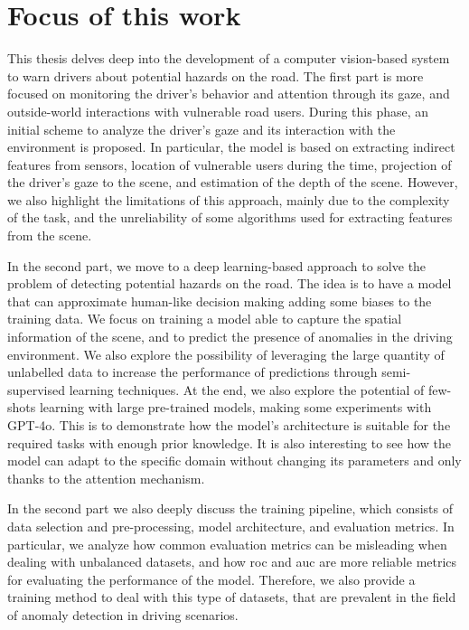 \section{Focus of this work}
\label{sec:focus}
This thesis delves deep into the development of a computer vision-based system 
to warn drivers about potential hazards on the road. The first part is more 
focused on monitoring the driver's behavior and attention through its gaze, and 
outside-world interactions with vulnerable road users. During this phase, 
an initial scheme to analyze the driver's gaze and its interaction with the 
environment is proposed. In particular, the model is based on extracting indirect 
features from sensors, location of vulnerable users during the time, projection 
of the driver's gaze to the scene, and estimation of the depth of the scene.
However, we also highlight the limitations of this approach, mainly due to the 
complexity of the task, and the unreliability of some algorithms used for 
extracting features from the scene.

In the second part, we move to a deep learning-based approach to solve the 
problem of detecting potential hazards on the road. The idea is to have a model 
that can approximate human-like decision making adding some biases to the 
training data.
We focus on training a model 
able to capture the spatial information of the scene, and to predict the presence 
of anomalies in the driving environment. We also explore the possibility of 
leveraging the large quantity of unlabelled data to increase the performance 
of predictions through semi-supervised learning techniques.
At the end, we also explore the potential of few-shots learning with large 
pre-trained models, making some experiments with GPT-4o. This is to demonstrate 
how the model's architecture is suitable for the required tasks with enough 
prior knowledge. It is also interesting to see how the model can adapt to 
the specific domain without changing its parameters and only thanks to the 
attention mechanism.

In the second part we also deeply discuss the training pipeline, which consists 
of data selection and pre-processing, model architecture, and evaluation metrics.
In particular, we analyze how common evaluation metrics can be misleading 
when dealing with unbalanced datasets, and how \ac{roc} and \ac{auc} are 
more reliable metrics for evaluating the performance of the model.
Therefore, we also provide a training method to deal with this type of datasets,
that are prevalent in the field of anomaly detection in driving scenarios.

